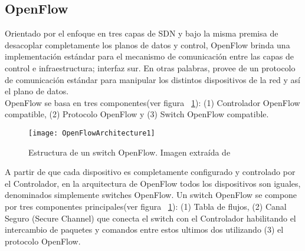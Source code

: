 \subsection{OpenFlow}

Orientado por el enfoque en tres capas de SDN y bajo la misma premisa de desacoplar completamente los planos de datos y control, OpenFlow\cite{mckeown2008openflow} brinda una implementaci\'on estándar para el mecanismo de comunicación entre las capas de control e infraestructura; interfaz sur. En otras palabras, provee de un protocolo de comunicación estándar para manipular los distintos dispositivos de la red y así el plano de datos.\\ 

OpenFlow se basa en tres componentes(ver figura ~\ref{fig:OpenFlowArch}): (1) Controlador OpenFlow compatible, (2) Protocolo OpenFlow y (3) Switch OpenFlow compatible.

  


\begin{figure}[htbp!] 
\centering    
\texttt{[image: OpenFlowArchitecture1]}
\caption[Estructura de un switch OpenFlow]{Estructura de un switch OpenFlow. Imagen extraída de \cite{mckeown2008openflow}}
\label{fig:OpenFlowArch}
\end{figure}

A partir de que cada dispositivo es completamente configurado y controlado por el Controlador, en la arquitectura de OpenFlow todos los dispositivos son iguales, denominados simplemente switches OpenFlow. Un switch OpenFlow se compone por tres componentes principales(ver figura ~\ref{fig:OpenFlowArch}): (1) Tabla de flujos, (2) Canal Seguro (Secure Channel) que conecta el switch con el Controlador habilitando el intercambio de paquetes y comandos entre estos ultimos dos utilizando (3) el protocolo OpenFlow.\\
 
